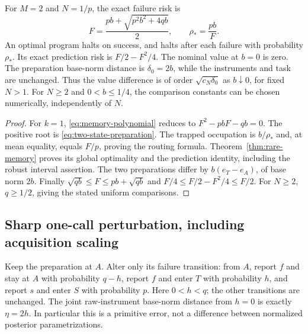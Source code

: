\begin{theorem}\label{thm:rare-preparation}
For $M=2$ and $N=1/p$, the exact failure risk is
\begin{equation}\label{eq:two-state-preparation}
 F=\frac{pb+\sqrt{p^2b^2+4qb}}2,
 \qquad \rho_* =\frac{pb}{F}.
\end{equation}
An optimal program halts on success, and halts after each failure with probability $\rho_*$. Its exact prediction risk is $F/2-F^2/4$. The nominal value at $b=0$ is zero. The preparation base-norm distance is $\delta_0=2b$, while the instruments and task are unchanged. Thus the value difference is of order $\sqrt{c_N\delta_0}$ as $b\downarrow0$, for fixed $N>1$. For $N\ge2$ and $0<b\le1/4$, the comparison constants can be chosen numerically, independently of $N$.
\end{theorem}
\begin{proof}
For $k=1$, \eqref{eq:memory-polynomial} reduces to
$F^2-pbF-qb=0$. The positive root is \eqref{eq:two-state-preparation}. The trapped occupation is $b/\rho_*$ and, at mean equality, equals $F/p$, proving the routing formula. Theorem~\ref{thm:rare-memory} proves its global optimality and the prediction identity, including the robust interval assertion. The two preparations differ by $b(e_T-e_A)$, of base norm $2b$. Finally $\sqrt{qb}\le F\le pb+\sqrt{qb}$ and $F/4\le F/2-F^2/4\le F/2$. For $N\ge2$, $q\ge1/2$, giving the stated uniform comparisons.
\end{proof}

\subsection{Sharp one-call perturbation, including acquisition scaling}
Keep the preparation at $A$. Alter only its failure transition: from $A$, report $f$ and stay at $A$ with probability $q-h$, report $f$ and enter $T$ with probability $h$, and report $s$ and enter $S$ with probability $p$. Here $0<h<q$; the other transitions are unchanged. The joint raw-instrument base-norm distance from $h=0$ is exactly $\eta=2h$. In particular this is a primitive error, not a difference between normalized posterior parametrizations.


